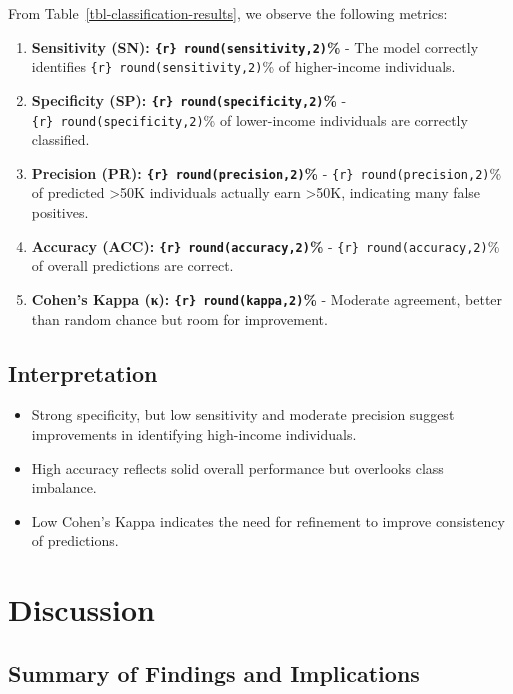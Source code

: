 \documentclass[
  letterpaper,
  DIV=11,
  numbers=noendperiod]{scrartcl}
\providecommand{\tightlist}{%
  \setlength{\itemsep}{0pt}\setlength{\parskip}{0pt}}\usepackage{longtable,booktabs,array}
\begin{document}
From Table~\ref{tbl-classification-results}, we observe the following
metrics:

\begin{enumerate}
\def\labelenumi{\arabic{enumi}.}
\item
  \textbf{Sensitivity (SN): \texttt{\{r\}\ round(sensitivity,2)}\%} -
  The model correctly identifies \texttt{\{r\}\ round(sensitivity,2)}\%
  of higher-income individuals.
\item
  \textbf{Specificity (SP): \texttt{\{r\}\ round(specificity,2)}\%} -
  \texttt{\{r\}\ round(specificity,2)}\% of lower-income individuals are
  correctly classified.
\item
  \textbf{Precision (PR): \texttt{\{r\}\ round(precision,2)}\%} -
  \texttt{\{r\}\ round(precision,2)}\% of predicted \textgreater50K
  individuals actually earn \textgreater50K, indicating many false
  positives.
\item
  \textbf{Accuracy (ACC): \texttt{\{r\}\ round(accuracy,2)}\%} -
  \texttt{\{r\}\ round(accuracy,2)}\% of overall predictions are
  correct.
\item
  \textbf{Cohen's Kappa (κ): \texttt{\{r\}\ round(kappa,2)}\%} -
  Moderate agreement, better than random chance but room for
  improvement.
\end{enumerate}

\hypertarget{interpretation}{%
\subsection{Interpretation}\label{interpretation}}

\begin{itemize}
\tightlist
\item
  Strong specificity, but low sensitivity and moderate precision suggest
  improvements in identifying high-income individuals.
\item
  High accuracy reflects solid overall performance but overlooks class
  imbalance.
\item
  Low Cohen's Kappa indicates the need for refinement to improve
  consistency of predictions.
\end{itemize}

\hypertarget{discussion}{%
\section{Discussion}\label{discussion}}

\hypertarget{summary-of-findings-and-implications}{%
\subsection{Summary of Findings and
Implications}\label{summary-of-findings-and-implications}}
\end{document}
